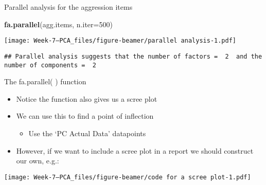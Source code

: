 \documentclass[
  ignorenonframetext,
]{beamer}
\newenvironment{Shaded}{\begin{snugshade}}{\end{snugshade}}
\newcommand{\DataTypeTok}[1]{\textcolor[rgb]{0.13,0.29,0.53}{#1}}
\newcommand{\DecValTok}[1]{\textcolor[rgb]{0.00,0.00,0.81}{#1}}
\newcommand{\KeywordTok}[1]{\textcolor[rgb]{0.13,0.29,0.53}{\textbf{#1}}}
\newcommand{\NormalTok}[1]{#1}
\newcommand{\OperatorTok}[1]{\textcolor[rgb]{0.81,0.36,0.00}{\textbf{#1}}}
\newcommand{\StringTok}[1]{\textcolor[rgb]{0.31,0.60,0.02}{#1}}
\providecommand{\tightlist}{%
  \setlength{\itemsep}{0pt}\setlength{\parskip}{0pt}}
\begin{document}
\begin{frame}[fragile]{Parallel analysis for the aggression items}
\protect\hypertarget{parallel-analysis-for-the-aggression-items}{}

\begin{Shaded}
\begin{Highlighting}[]
\KeywordTok{fa.parallel}\NormalTok{(agg.items, }\DataTypeTok{n.iter=}\DecValTok{500}\NormalTok{)}
\end{Highlighting}
\end{Shaded}

\texttt{[image: Week-7---PCA\_files/figure-beamer/parallel analysis-1.pdf]}

\begin{verbatim}
## Parallel analysis suggests that the number of factors =  2  and the number of components =  2
\end{verbatim}

\end{frame}

\begin{frame}[fragile]{The fa.parallel( ) function}
\protect\hypertarget{the-fa.parallel-function}{}

\begin{itemize}
\tightlist
\item
  Notice the function also gives us a scree plot
\item
  We can use this to find a point of inflection

  \begin{itemize}
  \tightlist
  \item
    Use the `PC Actual Data' datapoints
  \end{itemize}
\item
  However, if we want to include a scree plot in a report we should
  construct our own, e.g.:
\end{itemize}

\begin{Shaded}
\end{Shaded}

\texttt{[image: Week-7---PCA\_files/figure-beamer/code for a scree plot-1.pdf]}

\end{frame}
\end{document}
